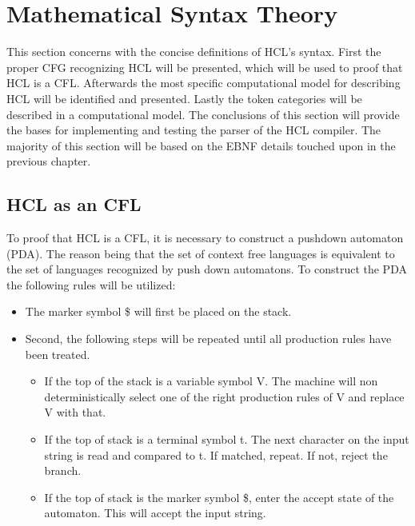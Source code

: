 \section{Mathematical Syntax Theory}
This section concerns with the concise definitions of HCL's syntax.
First the proper CFG recognizing HCL will be presented, which will be used to proof that HCL is a CFL. 
Afterwards the most specific computational model for describing HCL will be identified and presented. 
Lastly the token categories will be described in a computational model. 
The conclusions of this section will provide the bases for implementing and testing the parser of the HCL compiler. 
The majority of this section will be based on the EBNF details touched upon in the previous chapter.

\subsection{HCL as an CFL}

To proof that HCL is a CFL, it is necessary to construct a pushdown automaton (PDA).
The reason being that the set of context free languages is equivalent to the set of languages recognized by push down automatons.
To construct the PDA the following rules will be utilized:
\begin{center}
	\begin{itemize}
		\item The marker symbol \$ will first be placed on the stack.
		\item Second, the following steps will be repeated until all production rules have been treated.
		\begin{itemize}
			\item If the top of the stack is a variable symbol V. 
			The machine will non deterministically select one of the right production rules of V and replace V with that.   
			\item If the top of stack is a terminal symbol t. 
			The next character on the input string is read and compared to t. 
			If matched, repeat. 
			If not, reject the branch.
			\item If the top of stack is the marker symbol \$, enter the accept state of the automaton. 
			This will accept the input string.
		\end{itemize}
	\end{itemize}
\end{center}

